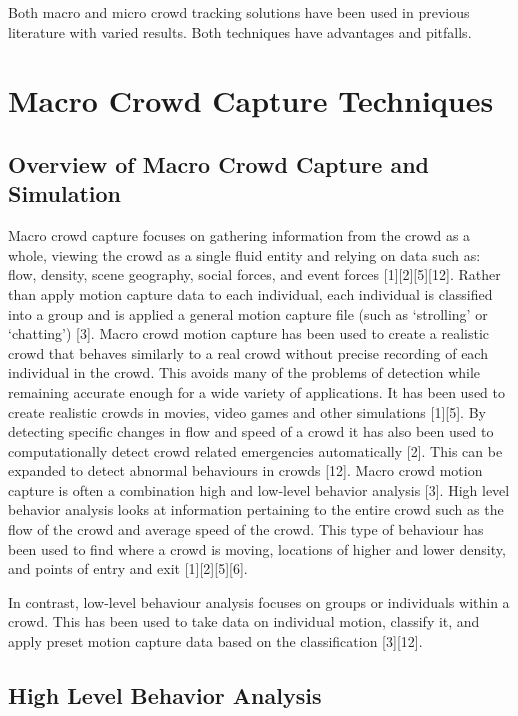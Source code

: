\documentclass[conference]{IEEEtran}
\begin{document}
Both macro and micro crowd tracking solutions have been used in previous literature with varied results. Both techniques have advantages and pitfalls. 

\section{Macro Crowd Capture Techniques}

\subsection{Overview of Macro Crowd Capture and Simulation}

Macro crowd capture focuses on gathering information from the crowd as a whole, viewing the crowd as a single fluid entity and relying on data such as: flow, density, scene geography, social forces, and event forces [1][2][5][12]. Rather than apply motion capture data to each individual, each individual is classified into a group and is applied a general motion capture file (such as ‘strolling’ or ‘chatting’) [3]. Macro crowd motion capture has been used to create a realistic crowd that behaves similarly to a real crowd without precise recording of each individual in the crowd. This avoids many of the problems of detection while remaining accurate enough for a wide variety of applications. It has been used to create realistic crowds in movies, video games and other simulations [1][5]. By detecting specific changes in flow and speed of a crowd it has also been used to computationally detect crowd related emergencies automatically [2]. This can be expanded to detect abnormal behaviours in crowds [12].
Macro crowd motion capture is often a combination high and low-level behavior analysis [3]. High level behavior analysis looks at information pertaining to the entire crowd such as the flow of the crowd and average speed of the crowd. This type of behaviour has been used to find where a crowd is moving, locations of higher and lower density, and points of entry and exit [1][2][5][6].

In contrast, low-level behaviour analysis focuses on groups or individuals within a crowd. This has been used to take data on individual motion, classify it, and apply preset motion capture data based on the classification [3][12]. 

\subsection{High Level Behavior Analysis}
\end{document}
